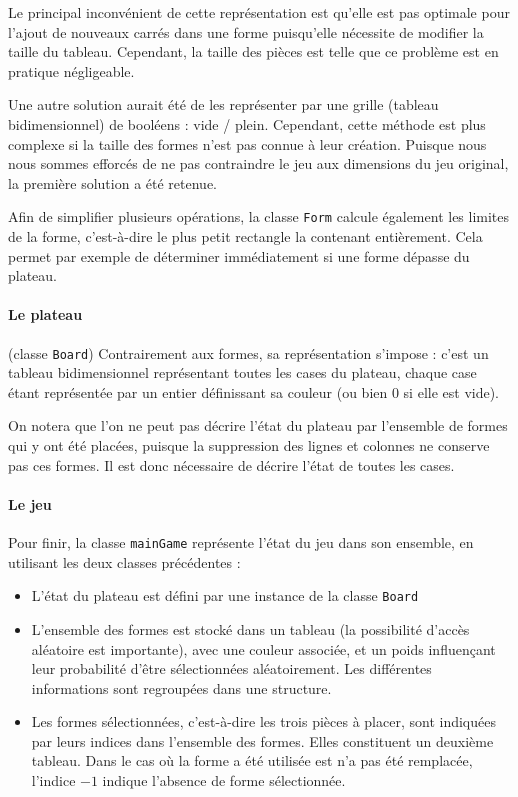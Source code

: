 \documentclass[11pt,a4paper]{article}
\begin{document}
Le principal inconvénient de cette représentation est qu'elle est pas optimale pour l'ajout de nouveaux carrés dans une forme puisqu'elle nécessite de modifier la taille du tableau. Cependant, la taille des pièces est telle que ce problème est en pratique négligeable.

Une autre solution aurait été de les représenter par une grille (tableau bidimensionnel) de booléens : vide / plein. Cependant, cette méthode est plus complexe si la taille des formes n'est pas connue à leur création. Puisque nous nous sommes efforcés de ne pas contraindre le jeu aux dimensions du jeu original, la première solution a été retenue.

Afin de simplifier plusieurs opérations, la classe \verb"Form" calcule également les limites de la forme, c'est-à-dire le plus petit rectangle la contenant entièrement. Cela permet par exemple de déterminer immédiatement si une forme dépasse du plateau.

\paragraph{Le plateau} (classe \verb"Board")
Contrairement aux formes, sa représentation s'impose : c'est un tableau bidimensionnel représentant toutes les cases du plateau, chaque case étant représentée par un entier définissant sa couleur (ou bien 0 si elle est vide).

On notera que l'on ne peut pas décrire l'état du plateau par l'ensemble de formes qui y ont été placées, puisque la suppression des lignes et colonnes ne conserve pas ces formes. Il est donc nécessaire de décrire l'état de toutes les cases.

\paragraph{Le jeu} 
Pour finir, la classe \verb"mainGame" représente l'état du jeu dans son ensemble, en utilisant les deux classes précédentes :

\begin{itemize}
\item L'état du plateau est défini par une instance de la classe \verb"Board"
\item L'ensemble des formes est stocké dans un tableau (la possibilité d'accès aléatoire est importante), avec une couleur associée, et un poids influençant leur probabilité d'être sélectionnées aléatoirement. Les différentes informations sont regroupées dans une structure.
\item Les formes sélectionnées, c'est-à-dire les trois pièces à placer, sont indiquées par leurs indices dans l'ensemble des formes. Elles constituent un deuxième tableau. Dans le cas où la forme a été utilisée est n'a pas été remplacée, l'indice $-1$ indique l'absence de forme sélectionnée.
\end{itemize}
\end{document}
